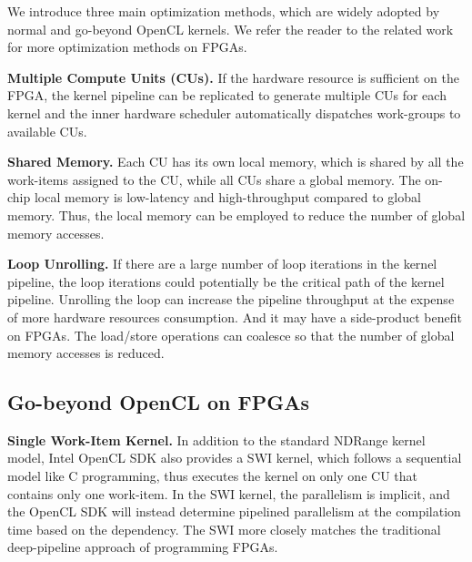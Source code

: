 We introduce three main optimization methods, which are widely adopted by normal and go-beyond OpenCL kernels. We refer the reader to the related work~\cite{fpga_opencl_model_hpca16} for more optimization methods on FPGAs. 

{\bf Multiple Compute Units (CUs). } If the hardware resource is sufficient on the FPGA, the kernel pipeline can be replicated to generate multiple CUs for each kernel and the inner hardware scheduler automatically dispatches work-groups to available CUs. %

{\bf Shared Memory. } Each CU has its own local memory, which is shared by all the work-items assigned to the CU, while all CUs share a global memory. The on-chip local memory is low-latency and high-throughput compared to global memory. Thus, the local memory can be employed to reduce the number of global memory accesses.

{\bf Loop Unrolling. } If there are a large number of loop iterations in the kernel pipeline, the loop iterations could potentially be the critical path of the kernel pipeline. Unrolling the loop can increase the pipeline throughput at the expense of more hardware resources consumption. And it may have a side-product benefit on FPGAs. The load/store operations can coalesce so that the number of global memory accesses is reduced.


\vspace{-1ex}
\subsection{Go-beyond OpenCL on FPGAs}

{\bf Single Work-Item Kernel. } 
In addition to the standard NDRange kernel model, Intel OpenCL SDK also provides a SWI kernel, which follows a sequential model like C programming, thus executes the kernel on only one CU that contains only one work-item. In the SWI kernel, the parallelism is implicit, and the OpenCL SDK will instead determine pipelined parallelism at the compilation time based on the dependency. The SWI more closely matches the traditional deep-pipeline approach of programming FPGAs.


